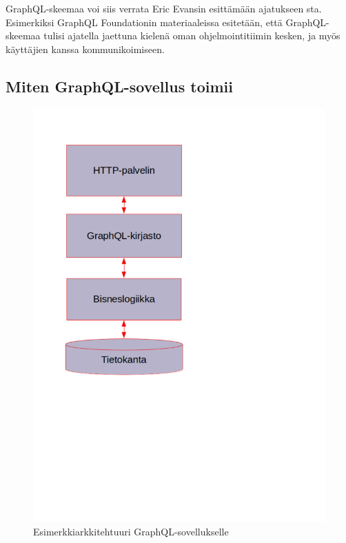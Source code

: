 GraphQL-skeemaa voi siis verrata Eric Evansin esittämään ajatukseen
sta. Esimerkiksi GraphQL Foundationin
materiaaleissa esitetään, että GraphQL-skeemaa tulisi ajatella jaettuna
kielenä oman ohjelmointitiimin kesken, ja myös käyttäjien kanssa
kommunikoimiseen.\cite{thinkingInGraphs}

\hypertarget{miten-graphql-sovellus-toimii}{%
\subsection{Miten GraphQL-sovellus
toimii}\label{miten-graphql-sovellus-toimii}}

\begin{figure}
\centering
\includegraphics{illustration/GraphQL-arkkitehtuuri.png}
\caption{\label{graphqlarkkitehtuuri} Esimerkkiarkkitehtuuri
GraphQL-sovellukselle}
\end{figure}

